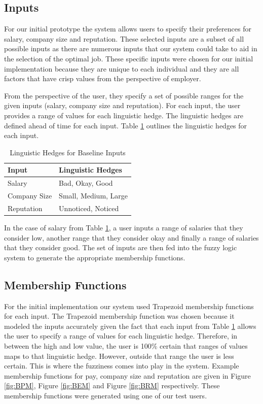 \documentclass[12pt,fleqn,reqno,letterpaper]{article}
\begin{document}
\subsection{Inputs}
For our initial prototype the system allows users to specify their preferences for salary, company size and reputation. These selected inputs are a subset of all possible inputs as there are numerous inputs that our system could take \cite{job-sat} to aid in the selection of the optimal job. These specific inputs were chosen for our initial implementation because they are unique to each individual and they are all factors that have crisp values from the perspective of employer.

From the perspective of the user, they specify a set of possible ranges for the given inputs (salary, company size and reputation). For each input, the user provides a range of values for each linguistic hedge. The linguistic hedges are defined ahead of time for each input. Table \ref{tbl:LINGUISTIC-HEDGES} outlines the linguistic hedges for each input.


\begin{table}[h]
  \caption{Linguistic Hedges for Baseline Inputs}
  \label{tbl:LINGUISTIC-HEDGES}
  \centering
\begin{tabular}{|l|l|}
\hline
\textbf{Input} & \textbf{Linguistic Hedges} \\ \hline
Salary         & Bad, Okay, Good            \\ \hline
Company Size   & Small, Medium, Large       \\ \hline
Reputation     & Unnoticed, Noticed         \\ \hline
\end{tabular}
\end{table}

In the case of salary from Table \ref{tbl:LINGUISTIC-HEDGES}, a user inputs a range of salaries that they consider low, another range that they consider okay and finally a range of salaries that they consider good. The set of inputs are then fed into the fuzzy logic system to generate the appropriate membership functions.

\subsection{Membership Functions}
\label{sec:membership_fn}
For the initial implementation our system used Trapezoid membership functions for each input. The Trapezoid membership function was chosen because it modeled the inputs accurately given the fact that each input from Table \ref{tbl:LINGUISTIC-HEDGES} allows the user to specify a range of values for each linguistic hedge. Therefore, in between the high and low value, the user is 100\% certain that ranges of values maps to that linguistic hedge. However, outside that range the user is less certain. This is where the fuzziness comes into play in the system. Example membership functions for pay, company size and reputation are given in Figure \ref{fig:BPM}, Figure \ref{fig:BEM} and Figure \ref{fig:BRM} respectively. These membership functions were generated using one of our test users.
\end{document}

